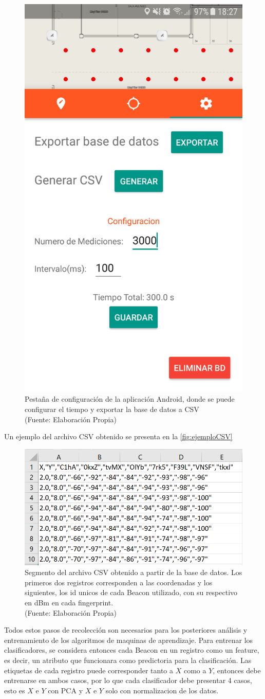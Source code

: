 \begin{figure}[ht!]
\centering
\includegraphics[width=.3\textwidth]{figures/configApp.png}
\caption[abs]{Pestaña de configuración de la aplicación Android, donde se puede configurar el tiempo y exportar la base de datos a CSV\\
{\scriptsize (Fuente: Elaboración Propia)}}
\label{fig:configApp}
\end{figure}


Un ejemplo del archivo CSV obtenido se presenta en la \autoref{fig:ejemploCSV}


\begin{figure}[ht!]
\centering
\includegraphics[width=.6\textwidth]{figures/ejemplo_csv.png}
\caption[abs]{Segmento del archivo CSV obtenido a partir de la base de datos. Los primeros dos registros corresponden a las coordenadas y los siguientes, los id unicos de cada Beacon utilizado, con su respectivo en dBm en cada fingerprint. \\
{\scriptsize (Fuente: Elaboración Propia)}}
\label{fig:ejemploCSV}
\end{figure}

Todos estos pasos de recolección son necesarios para los posteriores análisis y entrenamiento de los algoritmos de maquinas de aprendizaje. Para entrenar los clasificadores, se considera entonces cada Beacon en un registro como un feature, es decir, un atributo que funcionara como predictoria para la clasificación. Las etiquetas de cada registro puede corresponder tanto a $X$ como a $Y$, entonces debe entrenarse en ambos casos, por lo que cada clasificador debe presentar 4 casos, esto es $X$ e $Y$ con PCA y $X$ e $Y$ solo con normalizacion de los datos.


